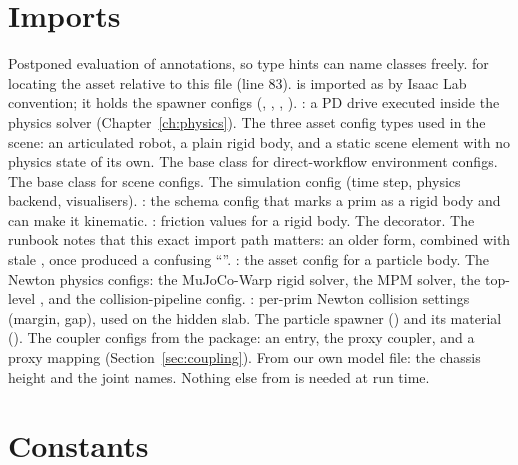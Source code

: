 \section{Imports}


\begin{explain}
 Postponed evaluation of annotations, so type hints can name classes
  freely.
  for locating the asset relative to this file
  (line 83).
  is imported as  by Isaac Lab
  convention; it holds the spawner configs (,
  , , ).
 : a PD drive executed inside the physics
  solver (Chapter~\ref{ch:physics}).
 The three asset config types used in the scene: an articulated robot,
  a plain rigid body, and a static scene element with no physics state of its
  own.
 The base class for direct-workflow environment configs.
 The base class for scene configs.
 The simulation config (time step, physics backend, visualisers).
 : the schema config that marks a prim as
  a rigid body and can make it kinematic.
 : friction values for a rigid body.
 The  decorator. The runbook notes that this exact
  import path matters: an older 
  form, combined with stale , once produced a confusing
  ``''.
 : the asset config for a particle body.
 The Newton physics configs: the MuJoCo-Warp rigid solver, the
  MPM solver, the top-level , and the collision-pipeline
  config.
 : per-prim Newton collision
  settings (margin, gap), used on the hidden slab.
 The particle spawner () and its material
  ().
 The coupler configs from the  package: an
  entry, the proxy coupler, and a proxy mapping
  (Section~\ref{sec:coupling}).
 From our own model file: the chassis height and the joint names.
  Nothing else from  is needed at run time.
\end{explain}

\section{Constants}

